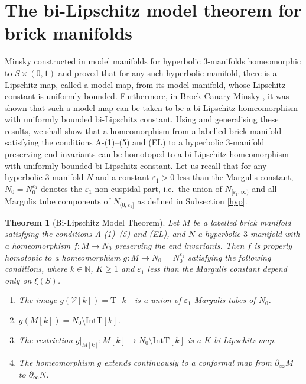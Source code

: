 \documentclass{amsart}
\newtheorem{theorem}{Theorem}[section]
\theoremstyle{definition}
\numberwithin{figure}{section}
\numberwithin{equation}{section}
\newcommand{\blackboard}[1]{\ensuremath{\mathbb{#1}}}
\newcommand{\naturals}{\blackboard{N}}
\newcommand{\ie}{i.e.\ }
\def\nn{\naturals}
\def\cv{\mathcal{V}}
\def\part{\partial}
\def\Int{\mathrm{Int}}
\def\ve{\varepsilon}
\def\ve{\varepsilon}
\begin{document}
\section{The bi-Lipschitz model theorem for brick manifolds}\label{S_BLM}
Minsky constructed  in \cite{mi2} model manifolds for hyperbolic $3$-manifolds homeomorphic to $S \times (0,1)$ and proved that for any such hyperbolic manifold, there is a Lipschitz map, called a model map, from its model manifold, whose Lipschitz constant is uniformly bounded.
Furthermore, in Brock-Canary-Minsky \cite{bcm}, it was shown that such a model map can be taken to be a bi-Lipschitz homeomorphism with uniformly bounded bi-Lipschitz constant.
Using and generalising these results, we shall show that a homeomorphism from a labelled brick manifold satisfying the conditions A-(1)--(5) and (EL) to a hyperbolic $3$-manifold preserving end invariants can be homotoped to a bi-Lipschitz homeomorphism with uniformly bounded bi-Lipschitz constant.
Let us recall that for any hyperbolic 3-manifold $N$ and a constant $\ve_1>0$ less than the Margulis constant, 
$N_0=N_0^{\ve_1}$ denotes the $\ve_1$-non-cuspidal part, \ie the union 
of $N_{[\ve_1,\infty)}$ and all Margulis tube components of $N_{(0,\ve_1]}$ as defined in Subsection \ref{hyp}.


\begin{theorem}[Bi-Lipschitz Model Theorem]\label{blm}
Let $M$ be a labelled brick manifold satisfying the conditions A-(1)--(5) and (EL), 
and  $N$   a hyperbolic $3$-manifold with  a homeomorphism $f:M\rightarrow N_0$ preserving 
the end invariants.
Then $f$ is properly homotopic to a homeomorphism $g:M\rightarrow N_0=N_0^{\ve_1}$ satisfying 
the following conditions, where $k\in \nn$, $K\geq 1$ and $\ve_1$ less than the Margulis constant depend only on $\xi(S)$.
\begin{enumerate}[\rm (i)]
\item
The image $g(\cv[k])=\mathrm{T}[k]$ is a union of  $\varepsilon_1$-Margulis tubes of $N_0$.
\item$g(M[k])=N_0\setminus \Int \mathrm T[k]$.
\item
The restriction $g|_{M[k]}:M[k]\rightarrow N_0\setminus \Int \mathrm{T}[k]$ is a $K$-bi-Lipschitz map.
\item
The homeomorphism $g$ extends continuously to a conformal map from $\part_\infty M$ to $\part_\infty N$.
\end{enumerate}
\end{theorem}
\end{document}
